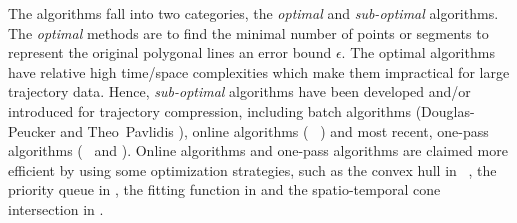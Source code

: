 The \lsa algorithms fall into two categories, \ie the \textit{optimal} and \textit{sub-optimal} algorithms. 
The \textit{optimal} methods\cite{Imai:Optimal,Chan:Optimal} are to find the minimal number of points or segments to represent the original polygonal lines \wrt an error bound $\epsilon$.
%
The optimal \lsa algorithms have relative high time/space complexities which make them impractical for large trajectory data.
Hence, \textit{sub-optimal} \lsa algorithms have been developed and/or introduced for trajectory compression, including batch algorithms (\eg Douglas-Peucker \cite{Douglas:Peucker, Meratnia:Spatiotemporal, Cao:Spatio} and Theo~Pavlidis \cite{Pavlidis:Segment}), online algorithms (\eg~\bqsa\cite{Liu:BQS} \squishe \cite{Muckell:Compression}) and most recent, one-pass algorithms (\eg~\operb \cite{Lin:Operb} and \cised \cite{Lin:Cised}). Online algorithms and one-pass algorithms are claimed more efficient by using some optimization strategies, such as the convex hull in \bqsa~\cite{Liu:BQS}, the priority queue in \squishe \cite{Muckell:Compression}, the {fitting function} in \operb \cite {Lin:Operb} and the spatio-temporal cone intersection in \cised \cite {Lin:Cised}. 

